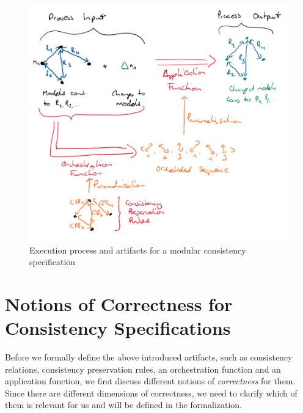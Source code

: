 \begin{figure}
    \centering
    \includegraphics[width=\textwidth]{figures/correctness/formal/execution_process.png}
    \caption[Modular consistency specification execution process and artifacts]{Execution process and artifacts for a modular consistency specification}
    \label{fig:formal:executionprocess}
\end{figure}



\section{Notions of Correctness for Consistency Specifications}




Before we formally define the above introduced artifacts, such as \glspl{consistency relation}, \glspl{consistency preservation rule}, an \gls{orchestration function} and an \gls{application function}, we first discuss different notions of \emph{correctness} for them.
Since there are different dimensions of correctness, we need to clarify which of them is relevant for us and will be defined in the formalization.

